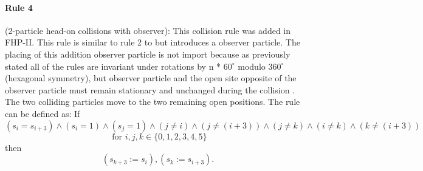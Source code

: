 \documentclass[a4paper,10pt]{article}
\begin{document}
\paragraph{Rule 4}(2-particle head-on collisions with observer):
This collision rule was added in FHP-II. This rule is similar to rule 2 to but introduces
a observer particle. The placing of this addition observer particle is not import because as previously stated
all of the rules are invariant under rotations by n * $60^{\circ}$ modulo $360^{\circ}$(hexagonal symmetry), but observer particle and the open site opposite of the observer particle must remain stationary and unchanged during the collision . The two colliding particles move to the two remaining open positions. The rule can be defined as: If \[(s_{i} = s_{i + 3})\wedge(s_{i} = 1)\wedge(s_{j} = 1)\wedge(j \neq i)\wedge(j \neq (i + 3))\wedge(j \neq k)\wedge(i \neq k)\wedge(k \neq (i + 3))\]\[\mbox{ for } i,j,k \in \{0, 1, 2, 3, 4, 5\}\] then 
\[ (s_{k + 3} := s_{i}), (s_{k} := s_{i + 3}).\]
\end{document}
